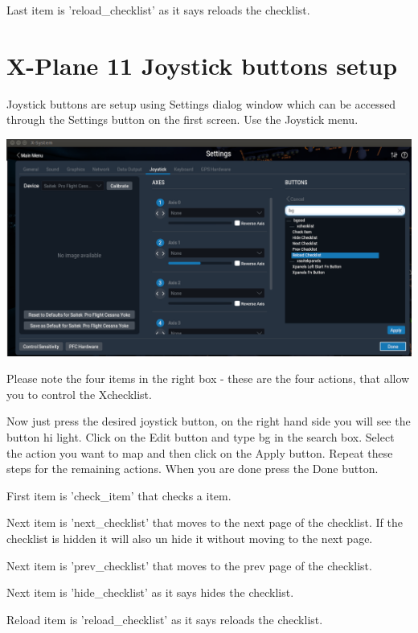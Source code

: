 \documentclass[11pt,parskip=half,a4paper]{scrartcl}
\begin{document}
Last item is 'reload\_checklist' as it says reloads the checklist.

\newpage
\section{X-Plane 11 Joystick buttons setup}

Joystick buttons are setup using Settings dialog window which can be accessed through the Settings button on the first screen. Use the Joystick menu.

\begin{center}
\includegraphics[width=17cm]{XchecklistUserManual-img003.png}
\end{center}

Please note the four items in the right box - these are the four actions, that allow you to control the 
Xchecklist. 

Now just press the desired joystick button, on the right hand side you will see the button hi light. Click on the Edit button and type bg in the search box. Select the action you want to map and then click on the Apply button. Repeat these steps for the remaining actions. When you are done press the Done button.

First item is 'check\_item' that checks a item. 

Next item is 'next\_checklist' that moves to the next page of the checklist. If the checklist is hidden it 
will also un hide it without moving to the next page. 

Next item is 'prev\_checklist' that moves to the prev page of the checklist.

Next item is 'hide\_checklist' as it says hides the checklist.

Reload item is 'reload\_checklist' as it says reloads the checklist.


\newpage
\end{document}
